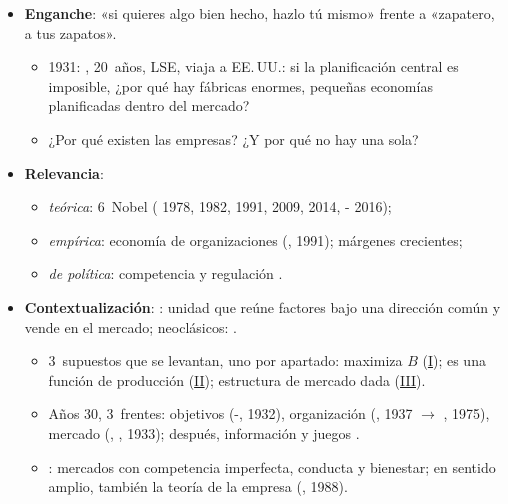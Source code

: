 \documentclass{article}
\begin{document}
\cabecerarepaso
\begin{columnas}

\begin{itemize}
\item \textbf{Enganche}: «si quieres algo bien hecho, hazlo tú mismo» frente a «zapatero, a tus zapatos».
  \begin{itemize}
  \item 1931: , 20~años, LSE, viaja a EE.\,UU.: si la planificación central es imposible, ¿por qué hay fábricas enormes, pequeñas economías planificadas dentro del mercado?
  \item ¿Por qué existen las empresas? ¿Y por qué no hay una sola?
  \end{itemize}
\item \textbf{Relevancia}:
  \begin{itemize}
  \item \emph{teórica}: 6~Nobel ( 1978,  1982,  1991,  2009,  2014, - 2016);
  \item \emph{empírica}: economía de organizaciones (, 1991); márgenes crecientes;
  \item \emph{de política}: competencia y regulación .
  \end{itemize}
\item \textbf{Contextualización}: : unidad que reúne factores bajo una dirección común y vende en el mercado; neoclásicos: .
  \begin{itemize}
  \item 3~supuestos que se levantan, uno por apartado: maximiza $B$ (\hyperref[rep:I]{I}); es una función de producción (\hyperref[rep:II]{II}); estructura de mercado dada (\hyperref[rep:III]{III}).
  \item Años 30, 3~frentes: objetivos (-, 1932), organización (, 1937 $\to$ , 1975), mercado (, , 1933); después, información y juegos .
  \item {}: mercados con competencia imperfecta, conducta y bienestar; en sentido amplio, también la teoría de la empresa (, 1988).
  \end{itemize}

\end{itemize}
\end{columnas}
\end{document}
